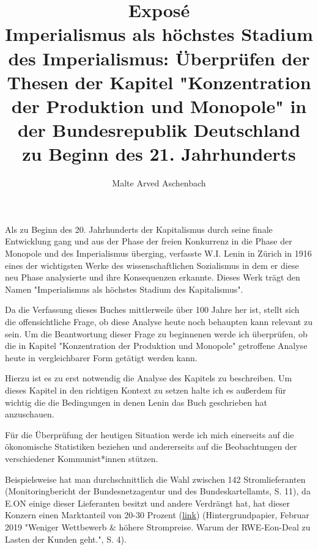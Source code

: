 \documentclass[a4paper]{article}
\title{Exposé\\Imperialismus als höchstes Stadium des Imperialismus: Überprüfen der Thesen der Kapitel "Konzentration der Produktion und Monopole" in der Bundesrepublik Deutschland zu Beginn des 21. Jahrhunderts}
\author{Malte Arved Aschenbach}
\begin{document}
    \maketitle
    Als zu Beginn des 20. Jahrhunderts der Kapitalismus durch seine finale Entwicklung gang und aus der Phase der freien Konkurrenz in die Phase der Monopole und des Imperialismus überging, verfasste W.I. Lenin in Zürich in 1916 eines der wichtigsten Werke des wissenschaftlichen Sozialismus in dem er diese neu Phase analysierte und ihre Konsequenzen erkannte. Dieses Werk trägt den Namen "Imperialismus als höchstes Stadium des Kapitalismus".
    
    Da die Verfassung dieses Buches mittlerweile über 100 Jahre her ist, stellt sich die offensichtliche Frage, ob diese Analyse heute noch behaupten kann relevant zu sein. Um die Beantwortung dieser Frage zu beginnenen werde ich überprüfen, ob die in Kapitel "Konzentration der Produktion und Monopole" getroffene Analyse heute in vergleichbarer Form getätigt werden kann.
    
    Hierzu ist es zu erst notwendig die Analyse des Kapitels zu beschreiben. Um dieses Kapitel in den richtigen Kontext zu setzen halte ich es außerdem für wichtig die die Bedingungen in denen Lenin das Buch geschrieben hat anzuschauen. 

    Für die Überprüfung der heutigen Situation werde ich mich einerseits auf die ökonomische Statistiken beziehen und andererseits auf die Beobachtungen der verschiedener Kommunist*innen stützen. 
    
    Beispielsweise hat man durchschnittlich die Wahl zwischen 142 Stromlieferanten (Monitoringbericht der Bundesnetzagentur und des Bundeskartellamts, S. 11), da E.ON einige dieser Lieferanten besitzt und andere Verdrängt hat, hat dieser Konzern einen Marktanteil von 20-30 Prozent (\href{https://www.welt.de/wirtschaft/article189294857Strommarkt-Angst-vor-Dominanz-von-E-on-und-RWE-waechst.html}{link}) (Hintergrundpapier, Februar 2019 "Weniger Wettbewerb \& höhere Strompreise. Warum der RWE-Eon-Deal zu Lasten der Kunden geht.", S. 4).
\end{document}
